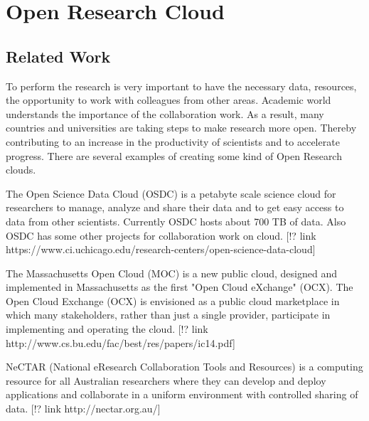 %


\section{Open Research Cloud}

\subsection{Related Work}
To perform the research is very important to have the necessary data, resources, the opportunity to work with colleagues from other areas. Academic world understands the importance of the collaboration work. As a result, many countries and universities are taking steps to make research more open. Thereby contributing to an increase in the productivity of scientists and to accelerate progress. There are several examples of creating some kind of Open Research clouds. 

The Open Science Data Cloud (OSDC) is a petabyte scale science cloud for researchers to manage, analyze and share their data and to get easy access to data from other scientists. Currently OSDC hosts about 700 TB of data. Also OSDC has some other projects for collaboration work on cloud. [!? link https://www.ci.uchicago.edu/research-centers/open-science-data-cloud]

The Massachusetts Open Cloud (MOC) is a new public cloud, designed and implemented in Massachusetts as the first "Open Cloud eXchange" (OCX). The Open Cloud Exchange (OCX) is envisioned as a public cloud marketplace in which many stakeholders, rather than just a single provider, participate in 
implementing and operating the cloud. [!? link http://www.cs.bu.edu/fac/best/res/papers/ic14.pdf]


NeCTAR (National eResearch Collaboration Tools and Resources) is a computing resource for all Australian researchers where they can develop and deploy applications and collaborate in a uniform environment with controlled sharing of data. [!? link http://nectar.org.au/]



